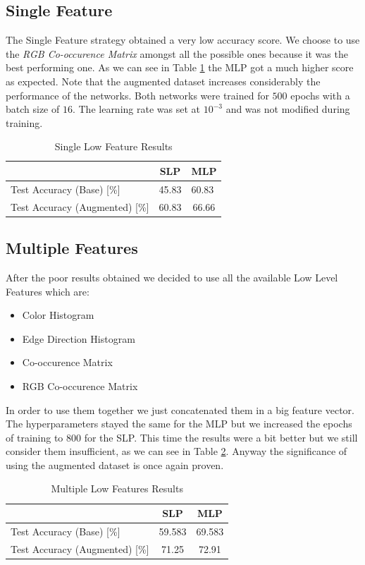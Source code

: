 \documentclass[10pt,a4paper]{report}
\begin{document}
\subsection{Single Feature}
The Single Feature strategy obtained a very low accuracy score. We choose to use the \textit{RGB Co-occurence Matrix} amongst all the possible ones because it was the best performing one. As we can see in Table \ref{tab:slf} the MLP got a much higher score as expected. Note that the augmented dataset increases considerably the performance of the networks. Both networks were trained for $500$ epochs with a batch size of $16$. The learning rate was set at $10^{-3}$ and was not modified during training.
\begin{table}[!ht]
\centering
\begin{tabular}{|l|c|c|}
\hline
                                   & SLP                        & MLP                        \\ \hline
Test Accuracy (Base) {[}\%{]}      & \multicolumn{1}{l|}{45.83} & \multicolumn{1}{l|}{60.83} \\ \hline
Test Accuracy (Augmented) {[}\%{]} & 60.83                      & 66.66                      \\ \hline
\end{tabular}
\caption{Single Low Feature Results}
\label{tab:slf}
\end{table}
\subsection{Multiple Features}
After the poor results obtained we decided to use all the available Low Level Features which are:
\begin{itemize}
\item Color Histogram
\item Edge Direction Histogram
\item Co-occurence Matrix
\item RGB Co-occurence Matrix
\end{itemize}
In order to use them together we just concatenated them in a big feature vector. The hyperparameters stayed the same for the MLP but we increased the epochs of training to $800$ for the SLP. This time the results were a bit better but we still consider them insufficient, as we can see in Table \ref{tab:mlf}. Anyway the significance of using the augmented dataset is once again proven.
\begin{table}[!ht]
\centering
\begin{tabular}{|l|c|c|}
\hline
                                   & SLP                         & MLP                         \\ \hline
Test Accuracy (Base) {[}\%{]}      & \multicolumn{1}{l|}{59.583} & \multicolumn{1}{l|}{69.583} \\ \hline
Test Accuracy (Augmented) {[}\%{]} & 71.25                       & 72.91                       \\ \hline
\end{tabular}
\caption{Multiple Low Features Results}
\label{tab:mlf}
\end{table}
\end{document}

